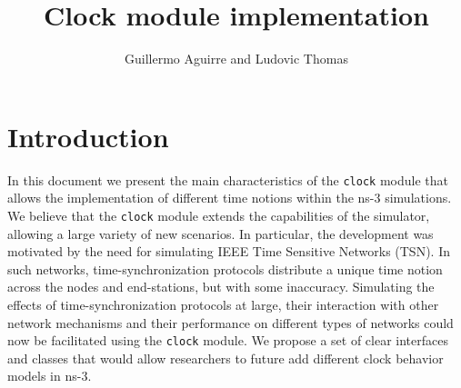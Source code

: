 \documentclass[times, twoside, watermark]{zHenriquesLab-StyleBioRxiv}
\begin{document}
\title{Clock module implementation}

\author[1,\Letter]{Guillermo Aguirre and Ludovic Thomas}



\maketitle

\section*{Introduction}
In this document we present the main characteristics of the \texttt{clock} module that allows the implementation of different time notions within the ns-3 simulations. 
We believe that the \texttt{clock} module extends the capabilities of the simulator, allowing a large variety of new scenarios. In particular, the development was motivated by the need for simulating IEEE Time Sensitive Networks (TSN).
In such networks, time-synchronization protocols distribute a unique time notion across the nodes and end-stations, but with some inaccuracy. Simulating the effects of time-synchronization protocols at large, their interaction with other network mechanisms and their performance on different types of networks could now be facilitated using the \texttt{clock} module.
We propose a set of clear interfaces and classes that would allow researchers to future add different clock behavior models in ns-3.
\end{document}
